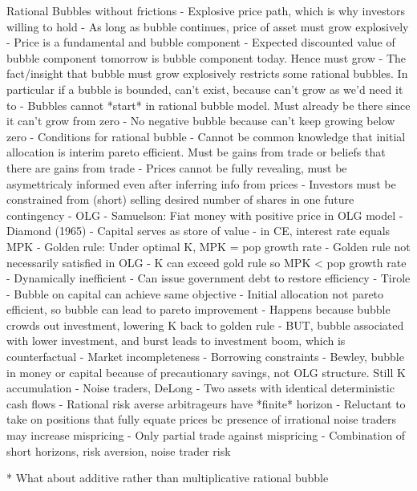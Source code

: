 \documentclass[12pt]{article}
\theoremstyle{plain}
\theoremstyle{definition}
\theoremstyle{remark}
\begin{document}
Rational Bubbles without frictions
- Explosive price path, which is why investors willing to hold
- As long as bubble continues, price of asset must grow explosively
- Price is a fundamental and bubble component
- Expected discounted value of bubble component tomorrow is bubble
  component today. Hence must grow
- The fact/insight that bubble must grow explosively restricts some
  rational bubbles. In particular if a bubble is bounded, can't exist,
  because can't grow as we'd need it to
- Bubbles cannot *start* in rational bubble model. Must already be there
  since it can't grow from zero
- No negative bubble because can't keep growing below zero
- Conditions for rational bubble
  - Cannot be common knowledge that initial allocation is interim pareto
    efficient. Must be gains from trade or beliefs that there are gains
    from trade
  - Prices cannot be fully revealing, must be asymettricaly informed
    even after inferring info from prices
  - Investors must be constrained from (short) selling desired number of
    shares in one future contingency
- OLG
  - Samuelson: Fiat money with positive price in OLG model
  - Diamond (1965)
    - Capital serves as store of value
    - in CE, interest rate equals MPK
    - Golden rule: Under optimal K, MPK = pop growth rate
    - Golden rule not necessarily satisfied in OLG
    - K can exceed gold rule so MPK < pop growth rate
    - Dynamically inefficient
    - Can issue government debt to restore efficiency
  - Tirole
    - Bubble on capital can achieve same objective
    - Initial allocation not pareto efficient, so bubble can lead to
      pareto improvement
    - Happens because bubble crowds out investment, lowering K back to
      golden rule
    - BUT, bubble associated with lower investment, and burst leads to
      investment boom, which is counterfactual
- Market incompleteness
  - Borrowing constraints
  - Bewley, bubble in money or capital because of precautionary savings,
    not OLG structure. Still K accumulation
- Noise traders, DeLong
  - Two assets with identical deterministic cash flows
  - Rational risk averse arbitrageurs have *finite* horizon
  - Reluctant to take on positions that fully equate prices bc presence
    of irrational noise traders may increase mispricing
  - Only partial trade against mispricing
  - Combination of short horizons, risk aversion, noise trader risk

* What about additive rather than multiplicative rational bubble
\end{document}
